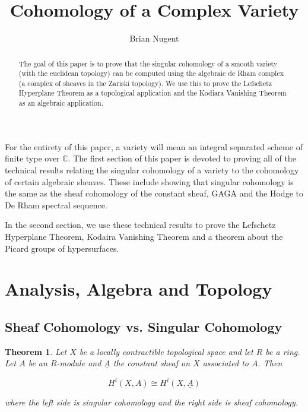 \documentclass[a4paper]{article}
\title{Cohomology of a Complex Variety}
\author{Brian Nugent}
\date{}
\newcommand{\C}{\mathbb{C}}
\newtheorem{theorem}{Theorem}
\numberwithin{theorem}{section}
\numberwithin{equation}{section}
\begin{document}
\maketitle

\begin{abstract}
    The goal of this paper is to prove that the singular cohomology of a smooth variety (with the euclidean topology) can be computed using the algebraic de Rham complex (a complex of sheaves in the Zariski topology). We use this to prove the Lefschetz Hyperplane Theorem as a topological application and the Kodiara Vanishing Theorem as an algebraic application.
\end{abstract}

For the entirety of this paper, a variety will mean an integral separated scheme of finite type over $\C$. The first section of this paper is devoted to proving all of the technical results relating the singular cohomology of a variety to the cohomology of certain algebraic sheaves. These include showing that singular cohomology is the same as the sheaf cohomology of the constant sheaf, GAGA and the Hodge to De Rham spectral sequence.

In the second section, we use these technical results to prove the Lefschetz Hyperplane Theorem, Kodaira Vanishing Theorem and a theorem about the Picard groups of hypersurfaces.

\tableofcontents

\section{Analysis, Algebra and Topology}

\subsection{Sheaf Cohomology vs. Singular Cohomology} \label{sheaftosing}

\begin{theorem} \label{sheafvsing}
    Let $X$ be a locally contractible topological space and let $R$ be a ring. Let $A$ be an $R$-module and $\underline{A}$ the constant sheaf on $X$ associated to $A$. Then

    $$ H^i(X,A) \cong H^i(X,\underline{A}) $$

    where the left side is singular cohomology and the right side is sheaf cohomology.
\end{theorem}
\end{document}
